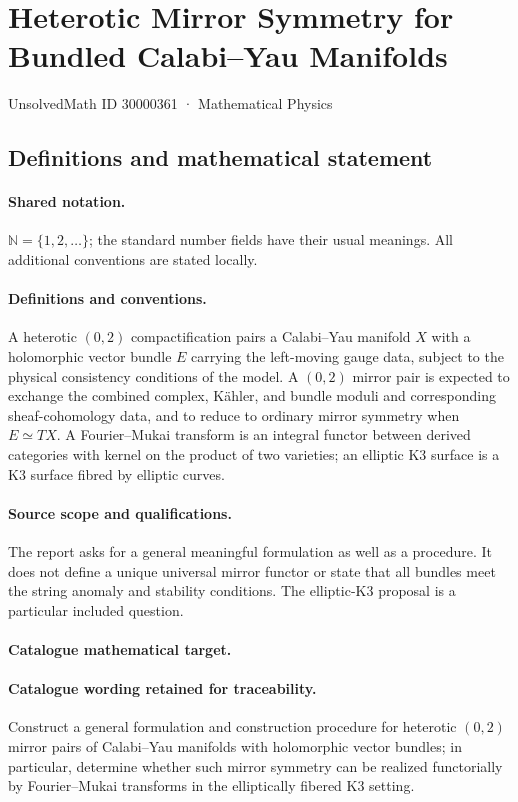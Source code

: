 \documentclass[11pt]{article}
\begin{document}
\setcounter{section}{30000360}
\section{Heterotic Mirror Symmetry for Bundled Calabi–Yau Manifolds}\label{30000361}
{\small UnsolvedMath ID 30000361 · Mathematical Physics}
\subsection{Definitions and mathematical statement}

\paragraph{Shared notation.}$\mathbb N=\{1,2,\ldots\}$; the standard number fields have their usual meanings. All additional conventions are stated locally.


\paragraph{Definitions and conventions.} A heterotic $(0,2)$ compactification pairs a Calabi--Yau manifold $X$ with a holomorphic vector bundle $E$ carrying the left-moving gauge data, subject to the physical consistency conditions of the model. A $(0,2)$ mirror pair is expected to exchange the combined complex, Kähler, and bundle moduli and corresponding sheaf-cohomology data, and to reduce to ordinary mirror symmetry when $E\simeq TX$. A Fourier--Mukai transform is an integral functor between derived categories with kernel on the product of two varieties; an elliptic K3 surface is a K3 surface fibred by elliptic curves.

\paragraph{Source scope and qualifications.} The report asks for a general meaningful formulation as well as a procedure. It does not define a unique universal mirror functor or state that all bundles meet the string anomaly and stability conditions. The elliptic-K3 proposal is a particular included question.

\paragraph{Catalogue mathematical target.}
\paragraph{Catalogue wording retained for traceability.}
Construct a general formulation and construction procedure for heterotic $(0,2)$ mirror pairs of Calabi–Yau manifolds with holomorphic vector bundles; in particular, determine whether such mirror symmetry can be realized functorially by Fourier–Mukai transforms in the elliptically fibered K3 setting.
\end{document}
